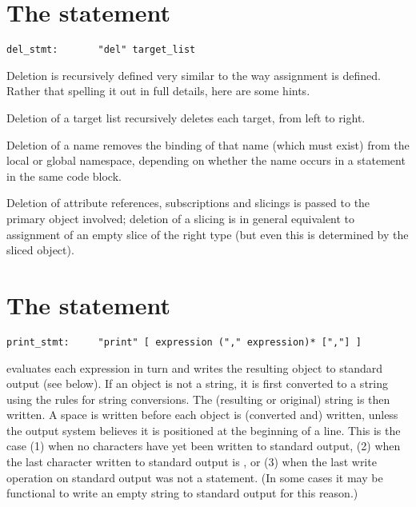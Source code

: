 \section{The  statement \label{del}}

\begin{verbatim}
del_stmt:       "del" target_list
\end{verbatim}

Deletion is recursively defined very similar to the way assignment is
defined. Rather that spelling it out in full details, here are some
hints.

Deletion of a target list recursively deletes each target, from left
to right.

Deletion of a name removes the binding of that name (which must exist)
from the local or global namespace, depending on whether the name
occurs in a  statement in the same code block.

Deletion of attribute references, subscriptions and slicings
is passed to the primary object involved; deletion of a slicing
is in general equivalent to assignment of an empty slice of the
right type (but even this is determined by the sliced object).

\section{The  statement \label{print}}

\begin{verbatim}
print_stmt:     "print" [ expression ("," expression)* [","] ]
\end{verbatim}

 evaluates each expression in turn and writes the
resulting object to standard output (see below).  If an object is not
a string, it is first converted to a string using the rules for string 
conversions.  The (resulting or original) string is then written.  A
space is written before each object is (converted and) written, unless 
the output system believes it is positioned at the beginning of a
line.  This is the case (1) when no characters have yet been written
to standard output, (2) when the last character written to standard
output is , or (3) when the last write operation on
standard output was not a  statement.  (In some cases
it may be functional to write an empty string to standard output for
this reason.)

